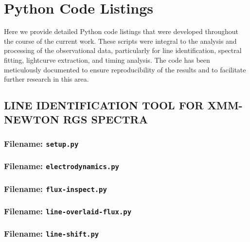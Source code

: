 \chapter{Python Code Listings} \label{appendix:code-listings}
		
	Here we provide detailed Python code listings that were developed throughout the course of the current work. These scripts were integral to the analysis and processing of the observational data, particularly for line identification, spectral fitting, lightcurve extraction, and timing analysis. The code has been meticulously documented to ensure reproducibility of the results and to facilitate further research in this area.
	
	\singlespacing
    \section{\MakeUppercase{Line Identification Tool for XMM-Newton RGS Spectra}}
		\subsection*{Filename: \texttt{setup.py}}
    	
    	    	
    	\subsection*{Filename: \texttt{electrodynamics.py}}
    	
    	
    	\subsection*{Filename: \texttt{flux-inspect.py}}
    	
    	
    	\subsection*{Filename: \texttt{line-overlaid-flux.py}}
    	
    	
    	\subsection*{Filename: \texttt{line-shift.py}}
    	
    	
